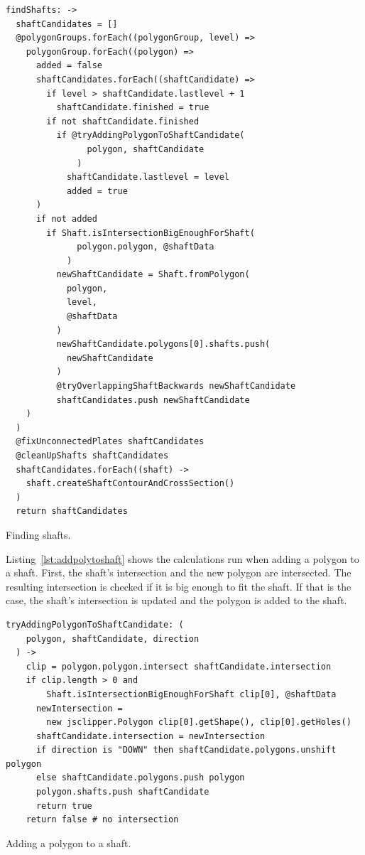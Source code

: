 \documentclass[../ClassicThesis.tex]{subfiles}
\begin{document}
\begin{listing}
\begin{verbatim}
findShafts: ->
  shaftCandidates = []
  @polygonGroups.forEach((polygonGroup, level) =>
    polygonGroup.forEach((polygon) =>
      added = false
      shaftCandidates.forEach((shaftCandidate) =>
        if level > shaftCandidate.lastlevel + 1
          shaftCandidate.finished = true
        if not shaftCandidate.finished
          if @tryAddingPolygonToShaftCandidate(
                polygon, shaftCandidate
              )
            shaftCandidate.lastlevel = level
            added = true
      )
      if not added
        if Shaft.isIntersectionBigEnoughForShaft(
              polygon.polygon, @shaftData
            )
          newShaftCandidate = Shaft.fromPolygon(
            polygon,
            level,
            @shaftData
          )
          newShaftCandidate.polygons[0].shafts.push(
            newShaftCandidate
          )
          @tryOverlappingShaftBackwards newShaftCandidate
          shaftCandidates.push newShaftCandidate
    )
  )
  @fixUnconnectedPlates shaftCandidates
  @cleanUpShafts shaftCandidates
  shaftCandidates.forEach((shaft) ->
    shaft.createShaftContourAndCrossSection()
  )
  return shaftCandidates
\end{verbatim}
\caption{Finding shafts.}
\label{lst:findshafts}
\end{listing}

Listing~\ref{lst:addpolytoshaft} shows the calculations run when adding a polygon to a shaft. First, the shaft's intersection and the new polygon are intersected. The resulting intersection is checked if it is big enough to fit the shaft. If that is the case, the shaft's intersection is updated and the polygon is added to the shaft.

\begin{listing}
\begin{verbatim}
tryAddingPolygonToShaftCandidate: (
    polygon, shaftCandidate, direction
  ) ->
    clip = polygon.polygon.intersect shaftCandidate.intersection
    if clip.length > 0 and
        Shaft.isIntersectionBigEnoughForShaft clip[0], @shaftData
      newIntersection =
        new jsclipper.Polygon clip[0].getShape(), clip[0].getHoles()
      shaftCandidate.intersection = newIntersection
      if direction is "DOWN" then shaftCandidate.polygons.unshift polygon
      else shaftCandidate.polygons.push polygon
      polygon.shafts.push shaftCandidate
      return true
    return false # no intersection
\end{verbatim}
\caption{Adding a polygon to a shaft.}
\label{lst:addpolytoshaft}
\end{listing}
\end{document}
